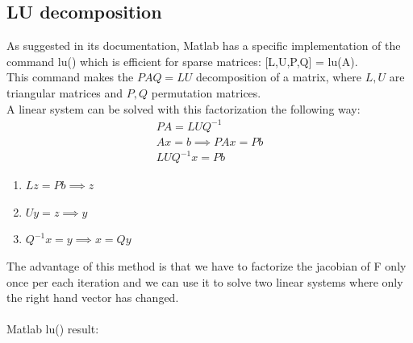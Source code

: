 \documentclass[]{article}
\begin{document}
\subsection{LU decomposition}
As suggested in its documentation, Matlab has a specific implementation of the command lu() which is efficient for sparse matrices: [L,U,P,Q] = lu(A).\\
This command makes the $PAQ = LU$ decomposition of a matrix, where $L,U$ are triangular matrices and $P,Q$ permutation matrices.\\
A linear system can be solved with this factorization the following way:
\begin{equation*}
\begin{split}
PA = LUQ^{-1}\\
Ax = b \implies PAx = Pb\\
LUQ^{-1}x = Pb
\end{split}
\end{equation*}
\begin{enumerate}
	\item $Lz = Pb \implies z$
	\item $Uy = z \implies y$
	\item $Q^{-1}x = y \implies x = Qy$
\end{enumerate}
The advantage of this method is that we have to factorize the jacobian of F only once per each iteration and we can use it to solve two linear systems where only the right hand vector has changed.\\\\
Matlab lu() result:
\end{document}
